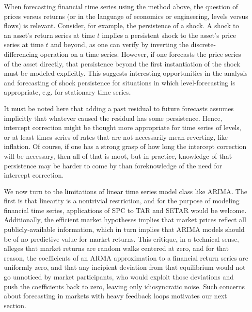 \documentclass{uiucthesis2021}
\theoremstyle{definition}
\begin{document}
  When forecasting financial time series using the method above, the question of prices versus returns (or in the language of economics or engineering, levels versus flows) is relevant.  Consider, for example, the persistence of a shock.  A shock to an asset's return series at time $t$ implies a persistent shock to the asset's price series at time $t$ and beyond, as one can verify by inverting the discrete-differencing operation on a time series.  However, if one forecasts the price series of the asset directly, that persistence beyond the first instantiation of the shock must be modeled explicitly.  This suggests interesting opportunities in the analysis and forecasting of shock persistence for situations in which level-forecasting is appropriate, e.g. for stationary time series.
  
  It must be noted here that adding a past residual to future forecasts assumes implicitly that whatever caused the residual has some persistence.  Hence, intercept correction might be thought more appropriate for time series of levels, or at least times series of rates that are not necessarily mean-reverting, like inflation.  Of course, if one has a strong grasp of how long the intercept correction will be necessary, then all of that is moot, but in practice, knowledge of that persistence may be harder to come by than foreknowledge of the need for intercept correction. 
  
  We now turn to the limitations of linear time series model class like ARIMA.  The first is that linearity is a nontrivial restriction, and for the purpose of modeling financial time series, applications of SPC to TAR and SETAR would be welcome.  Additionally, the efficient market hypotheses implies that market prices reflect all publicly-available information, which in turn implies that ARIMA models should be of no predictive value for market returns.  This critique, in a technical sense, alleges that market returns are random walks centered at zero, and for that reason, the coefficients of an ARMA approximation to a financial return series are uniformly zero, and that any incipient deviation from that equilibrium would not go unnoticed by market participants, who would exploit those deviations and push the coefficients back to zero, leaving only idiosyncratic noise.  Such concerns about forecasting in markets with heavy feedback loops motivates our next section.
\end{document}

